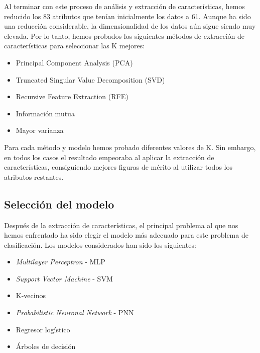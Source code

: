 \documentclass[journal,twoside]{JoPhA}
\begin{document}
Al terminar con este proceso de análisis y extracción de características, hemos reducido los 83 atributos que tenían inicialmente los datos a 61. Aunque ha sido una reducción considerable, la dimensionalidad de los datos aún sigue siendo muy elevada. Por lo tanto, hemos probados los siguientes métodos de extracción de características para seleccionar las K mejores: \\

\begin{itemize}
	\item Principal Component Analysis (PCA)
	\item Truncated Singular Value Decomposition (SVD)
	\item Recursive Feature Extraction (RFE)
	\item Información mutua
	\item Mayor varianza \\
\end{itemize}

Para cada método y modelo hemos probado diferentes valores de K. Sin embargo, en todos los casos el resultado empeoraba al aplicar la extracción de características, consiguiendo mejores figuras de mérito al utilizar todos los atributos restantes. \\

\subsection{Selección del modelo}
Después de la extracción de características, el principal problema al que nos hemos enfrentado ha sido elegir el modelo más adecuado para este problema de clasificación. Los modelos considerados han sido los siguientes: \\

\begin{itemize}
	\item \textit{Multilayer Perceptron} - MLP
	\item \textit{Support Vector Machine} - SVM
	\item K-vecinos
	\item \textit{Probabilistic Neuronal Network} - PNN
	\item Regresor logístico
	\item Árboles de decisión \\
\end{itemize}
\end{document}
